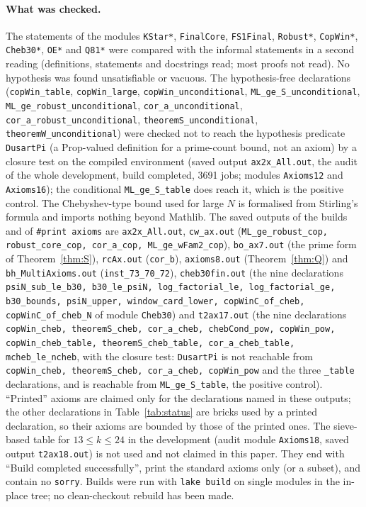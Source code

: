 \documentclass[11pt]{article}
\theoremstyle{definition}
\theoremstyle{remark}
\begin{document}
\paragraph{What was checked.}
{\sloppy The statements of the modules \texttt{KStar*}, \texttt{FinalCore}, \texttt{FS1Final}, \texttt{Robust*}, \texttt{CopWin*}, \texttt{Cheb30*}, \texttt{OE*} and \texttt{Q81*} were compared with the informal statements in a second reading (definitions, statements and docstrings read; most proofs not read). No hypothesis was found unsatisfiable or vacuous. The hypothesis-free declarations (\texttt{copWin\_table}, \texttt{copWin\_large}, \texttt{copWin\_unconditional}, \texttt{ML\_ge\_S\_unconditional}, \texttt{ML\_ge\_robust\_unconditional}, \texttt{cor\_a\_unconditional}, \texttt{cor\_a\_robust\_unconditional}, \texttt{theoremS\_unconditional}, \texttt{theoremW\_unconditional}) were checked not to reach the hypothesis predicate \texttt{DusartPi} (a Prop-valued definition for a prime-count bound, not an axiom) by a closure test on the compiled environment (saved output \texttt{ax2x\_All.out}, the audit of the whole development, build completed, 3691 jobs; modules \texttt{Axioms12} and \texttt{Axioms16}); the conditional \texttt{ML\_ge\_S\_table} does reach it, which is the positive control. The Chebyshev-type bound used for large $N$ is formalised from Stirling's formula and imports nothing beyond Mathlib. The saved outputs of the builds and of \texttt{\#print axioms} are \texttt{ax2x\_All.out}, \texttt{cw\_ax.out} (\texttt{ML\_ge\_robust\_cop, robust\_core\_cop, cor\_a\_cop, ML\_ge\_wFam2\_cop}), \texttt{bo\_ax7.out} (the prime form of Theorem~\ref{thm:S}), \texttt{rcAx.out} (\texttt{cor\_b}), \texttt{axioms8.out} (Theorem~\ref{thm:Q}) and \texttt{bh\_MultiAxioms.out} (\texttt{inst\_73\_70\_72}), \texttt{cheb30fin.out} (the nine declarations \texttt{psiN\_sub\_le\_b30, b30\_le\_psiN, log\_factorial\_le, log\_factorial\_ge, b30\_bounds, psiN\_upper, window\_card\_lower, copWinC\_of\_cheb, copWinC\_of\_cheb\_N} of module \texttt{Cheb30}) and \texttt{t2ax17.out} (the nine declarations \texttt{copWin\_cheb, theoremS\_cheb, cor\_a\_cheb, chebCond\_pow, copWin\_pow, copWin\_cheb\_table, theoremS\_cheb\_table, cor\_a\_cheb\_table, mcheb\_le\_ncheb}, with the closure test: \texttt{DusartPi} is not reachable from \texttt{copWin\_cheb, theoremS\_cheb, cor\_a\_cheb, copWin\_pow} and the three \texttt{\_table} declarations, and is reachable from \texttt{ML\_ge\_S\_table}, the positive control). ``Printed'' axioms are claimed only for the declarations named in these outputs; the other declarations in Table~\ref{tab:status} are bricks used by a printed declaration, so their axioms are bounded by those of the printed ones. The sieve-based table for $13\le k\le24$ in the development (audit module \texttt{Axioms18}, saved output \texttt{t2ax18.out}) is not used and not claimed in this paper. They end with ``Build completed successfully'', print the standard axioms only (or a subset), and contain no \texttt{sorry}. Builds were run with \texttt{lake build} on single modules in the in-place tree; no clean-checkout rebuild has been made.\par}
\end{document}
